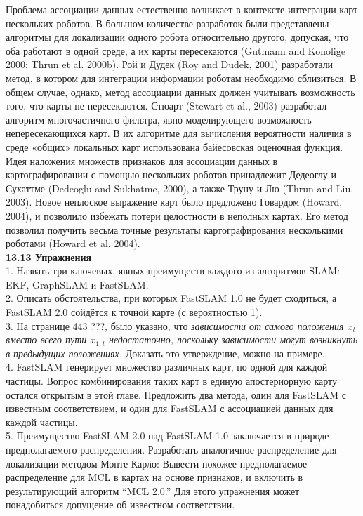 \documentclass[10pt,a4paper]{article}
\begin{document}
Проблема ассоциации данных естественно возникает в контексте интеграции карт нескольких роботов. В большом количестве разработок были представлены алгоритмы для локализации одного робота относительно другого, допуская, что оба работают в одной среде, а их карты пересекаются (Gutmann and Konolige 2000; Thrun et al. 2000b). Рой и Дудек (Roy and Dudek, 2001) разработали метод, в котором для интеграции информации роботам необходимо сблизиться. В общем случае, однако, метод ассоциации данных должен учитывать возможность того, что карты не пересекаются. Стюарт (Stewart et al., 2003) разработал алгоритм многочастичного фильтра, явно моделирующего возможность непересекающихся карт. В их алгоритме для вычисления вероятности наличия в среде «общих» локальных карт использована байесовская оценочная функция. Идея наложения множеств признаков для ассоциации данных в картографировании с помощью нескольких роботов принадлежит Дедеоглу и Сухаттме (Dedeoglu and Sukhatme, 2000), а также Труну и Лю (Thrun and Liu, 2003). Новое неплоское выражение карт было предложено Говардом (Howard, 2004), и позволило избежать потери целостности в неполных картах. Его метод позволил получить весьма точные результаты картографирования несколькими роботами (Howard et al. 2004).\\

\textbf{13.13	Упражнения}\\

1.	Назвать три ключевых, явных преимуществ каждого из алгоритмов SLAM: EKF, GraphSLAM и FastSLAM.\\

2.	Описать обстоятельства, при которых FastSLAM 1.0 не будет сходиться, а FastSLAM 2.0 сойдётся к точной карте (с вероятностью 1).\\

3.	На странице 443 ???, было указано, что \textit{зависимости от самого положения $x_t$ вместо всего пути $x_{1:t}$ недостаточно, поскольку зависимости могут возникнуть в предыдущих положениях.} Доказать это утверждение, можно на примере.\\

4.	FastSLAM генерирует множество различных карт, по одной для каждой частицы. Вопрос комбинирования таких карт в единую апостериорную карту остался открытым в этой главе. Предложить два метода, один для FastSLAM с известным соответствием, и один для FastSLAM с ассоциацией данных для каждой частицы.\\

5.	Преимущество FastSLAM 2.0 над FastSLAM 1.0 заключается в природе предполагаемого распределения. Разработать аналогичное распределение для локализации методом Монте-Карло: Вывести похожее предполагаемое распределение для MCL в картах на основе признаков, и включить в результирующий алгоритм “MCL 2.0.” Для этого упражнения может понадобиться допущение об известном соответствии.\\
\end{document}
